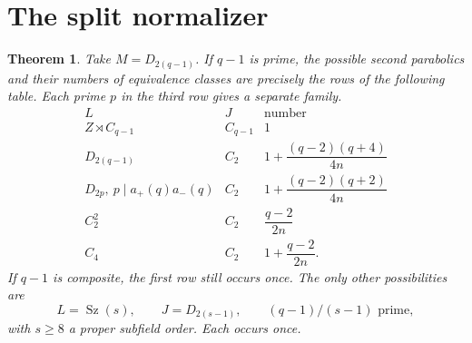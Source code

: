 \documentclass[11pt,a4paper]{article}
\newtheorem{theorem}{Theorem}
\newcommand{\Sz}{\operatorname{Sz}}
\begin{document}
\section{The split normalizer}
\begin{theorem}\label{split}
Take $M=D_{2(q-1)}$. If $q-1$ is prime, the possible second
parabolics and their numbers of equivalence classes are precisely
the rows of the following table. Each prime $p$ in the third row
gives a separate family.
\[
\begin{array}{c|c|c}
 L&J&\text{number}\\\hline
 Z\rtimes C_{q-1}&C_{q-1}&1\\
 D_{2(q-1)}&C_2&1+\dfrac{(q-2)(q+4)}{4n}\\[2mm]
 D_{2p},\ p\mid a_+(q)a_-(q)&C_2&1+\dfrac{(q-2)(q+2)}{4n}\\[2mm]
 C_2^2&C_2&\dfrac{q-2}{2n}\\[2mm]
 C_4&C_2&1+\dfrac{q-2}{2n}.
\end{array}                                               \tag{12}
\]
If $q-1$ is composite, the first row still occurs once. The only
other possibilities are
\[
 L=\Sz(s),\qquad J=D_{2(s-1)},
 \qquad (q-1)/(s-1)\text{ prime},                         \tag{13}
\]
with $s\ge8$ a proper subfield order. Each occurs once.
\end{theorem}
\end{document}
